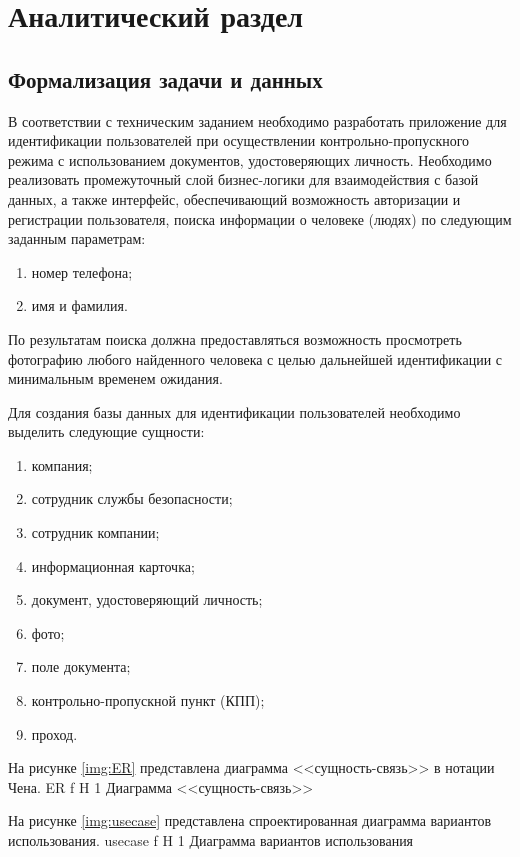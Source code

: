 \chapter{Аналитический раздел}

\section{Формализация задачи и данных}

В соответствии с техническим заданием необходимо разработать приложение для идентификации пользователей при осуществлении контрольно-пропускного режима с использованием документов, удостоверяющих личность.
Необходимо реализовать промежуточный слой бизнес-логики для взаимодействия с базой данных, а также интерфейс, обеспечивающий возможность авторизации и регистрации пользователя, поиска информации о человеке (людях) по следующим заданным параметрам:
\begin{enumerate}
	\item номер телефона;
	\item имя и фамилия.
\end{enumerate}
По результатам поиска должна предоставляться возможность просмотреть фотографию любого найденного человека с целью дальнейшей идентификации с минимальным временем ожидания.

Для создания базы данных для идентификации пользователей необходимо выделить следующие сущности:
\begin{enumerate}
	\item компания;
	\item сотрудник службы безопасности;
	\item сотрудник компании;
	\item информационная карточка;
	\item документ, удостоверяющий личность;
	\item фото;
	\item поле документа;
	\item контрольно-пропускной пункт (КПП);
	\item проход.
\end{enumerate}

На рисунке \ref{img:ER} представлена диаграмма <<сущность-связь>> в нотации Чена.
	{ER}
	{f}
	{H}
	{1\textwidth}
	{Диаграмма <<сущность-связь>>}

\clearpage

На рисунке \ref{img:usecase} представлена спроектированная диаграмма вариантов использования.
	{usecase}
	{f}
	{H}
	{1\textwidth}
	{Диаграмма вариантов использования}


